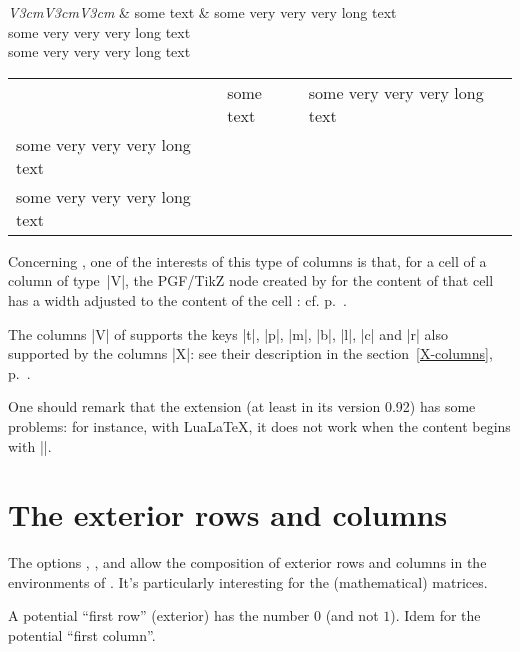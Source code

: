 \documentclass[dvipsnames]{article}%
\begin{document}
\medskip
\begin{Code}
\begin{NiceTabular}[corners=NW,hvlines]{\emph{V{3cm}V{3cm}V{3cm}}}
& some text & some very very very long text \\
some very very very long text \\
some very very very long text 
\end{NiceTabular}
\end{Code}

\medskip
\begin{center}
\begin{NiceTabular}[corners=NW,hvlines]{V{3cm}V{3cm}V{3cm}}
& some text & some very very very long text \\
some very very very long text \\
some very very very long text 
\end{NiceTabular}
\end{center}

\bigskip
Concerning , one of the
interests of this type of columns is that, for a cell of a column of type~|V|,
the PGF/TikZ node created by  for the content of that cell has
a width adjusted to the content of the cell : cf. p.~\pageref{node-V}. 


\bigskip
The columns |V| of  supports the keys |t|, |p|, |m|, |b|, |l|,
|c| and |r| also supported by the columns |X|: see their description in the
section~\ref{X-columns}, p.~\pageref{X-columns}.

\bigskip
One should remark that the extension  (at least in its version
0.92) has some problems: for instance, with LuaLaTeX, it does not work when
the content begins with |\color|.



\bigskip
\section{The exterior rows and columns}


The options , ,
 and  allow the composition of
exterior rows and columns in the environments of . It's
particularly interesting for the (mathematical) matrices.
\label{exterior}

A potential ``first row'' (exterior) has the number $0$ (and not $1$). Idem
for the potential ``first column''. 
\end{document}
